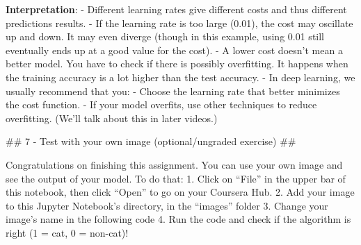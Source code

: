 \documentclass[11pt]{article}
\begin{document}
    \textbf{Interpretation}: - Different learning rates give different costs
and thus different predictions results. - If the learning rate is too
large (0.01), the cost may oscillate up and down. It may even diverge
(though in this example, using 0.01 still eventually ends up at a good
value for the cost). - A lower cost doesn't mean a better model. You
have to check if there is possibly overfitting. It happens when the
training accuracy is a lot higher than the test accuracy. - In deep
learning, we usually recommend that you: - Choose the learning rate that
better minimizes the cost function. - If your model overfits, use other
techniques to reduce overfitting. (We'll talk about this in later
videos.)

    \#\# 7 - Test with your own image (optional/ungraded exercise) \#\#

Congratulations on finishing this assignment. You can use your own image
and see the output of your model. To do that: 1. Click on ``File'' in
the upper bar of this notebook, then click ``Open'' to go on your
Coursera Hub. 2. Add your image to this Jupyter Notebook's directory, in
the ``images'' folder 3. Change your image's name in the following code
4. Run the code and check if the algorithm is right (1 = cat, 0 =
non-cat)!
\end{document}
